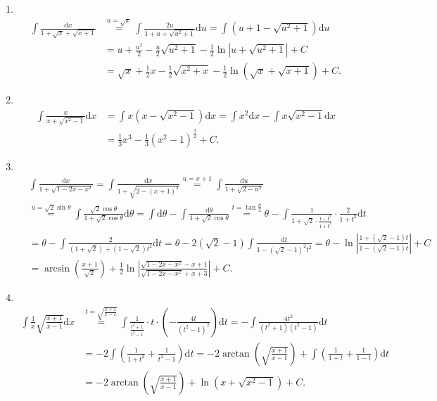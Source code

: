 \begin{solution}
\begin{enumerate}
    \item[38.]\\
    \[
    \begin{aligned}
    \int\frac{\mathrm{d}x}{1+\sqrt{x}+\sqrt{x+1}}&\overset{u=\sqrt{x}}{=}\int\frac{2u}{1+u+\sqrt{u^2+1}}\mathrm{d}u=\int\left(u+1-\sqrt{u^2+1}\right)\mathrm{d}u\\
    &=u+\frac{u^2}{2}-\frac{u}{2}\sqrt{u^2+1}-\frac{1}{2}\ln\left|u+\sqrt{u^2+1}\right|+C\\
    &=\sqrt{x}+\frac{1}{2}x-\frac{1}{2}\sqrt{x^2+x}-\frac{1}{2}\ln\left(\sqrt{x}+\sqrt{x+1}\right)+C.
    \end{aligned}
    \]

    \item[39.]\\
    \[
    \begin{aligned}
    \int\frac{x}{x+\sqrt{x^2-1}}\mathrm{d}x&=\int x\left(x-\sqrt{x^2-1}\right)\mathrm{d}x=\int x^2\mathrm{d}x-\int x\sqrt{x^2-1}\mathrm{d}x\\
    &=\frac{1}{3}x^3-\frac{1}{3}(x^2-1)^{\frac{3}{2}}+C.
    \end{aligned}
    \]

    \item[40.]\\
    \[
    \begin{aligned}
    &\int\frac{\mathrm{d}x}{1+\sqrt{1-2x-x^2}}=\int\frac{\mathrm{d}x}{1+\sqrt{2-(x+1)^2}}\overset{u=x+1}{=}\int\frac{\mathrm{d}u}{1+\sqrt{2-u^2}}\\
    &\overset{u=\sqrt{2}\sin\theta}{=}\int\frac{\sqrt{2}\cos\theta}{1+\sqrt{2}\cos\theta}\mathrm{d}\theta=\int\mathrm{d}\theta-\int\frac{\mathrm{d}\theta}{1+\sqrt{2}\cos\theta}\overset{t=\tan\frac{\theta}{2}}{=}\theta-\int\frac{1}{1+\sqrt{2}\cdot\frac{1-t^2}{1+t^2}}\cdot\frac{2}{1+t^2}\mathrm{d}t\\
    &=\theta-\int\frac{2}{(1+\sqrt{2})+(1-\sqrt{2})t^2}\mathrm{d}t=\theta-2(\sqrt{2}-1)\int\frac{\mathrm{d}t}{1-(\sqrt{2}-1)^2t^2}=\theta-\ln\left|\frac{1+(\sqrt{2}-1)t}{1-(\sqrt{2}-1)t}\right|+C\\
    &=\arcsin\left(\frac{x+1}{\sqrt{2}}\right)+\frac{1}{2}\ln\left|\frac{\sqrt{1-2x-x^2}-x+1}{\sqrt{1-2x-x^2}+x+3}\right|+C.
    \end{aligned}
    \]

    \item[41.]\\
    \[
    \begin{aligned}
    \int\frac{1}{x}\sqrt{\frac{x+1}{x-1}}\mathrm{d}x&\overset{t=\sqrt{\frac{x+1}{x-1}}}{=}\int \frac{1}{\frac{t^2+1}{t^2-1}}\cdot t\cdot\left(-\frac{4t}{(t^2-1)^2}\right)\mathrm{d}t=-\int\frac{4t^2}{(t^2+1)(t^2-1)}\mathrm{d}t\\
    &=-2\int\left(\frac{1}{1+t^2}+\frac{1}{t^2-1}\right)\mathrm{d}t=-2\arctan\left(\sqrt{\frac{x+1}{x-1}}\right)+\int\left(\frac{1}{1+t}+\frac{1}{1-t}\right)\mathrm{d}t\\
    &=-2\arctan\left(\sqrt{\frac{x+1}{x-1}}\right)+\ln\left(x+\sqrt{x^2-1}\right)+C.
    \end{aligned}
    \]


\end{enumerate}
\end{solution}
